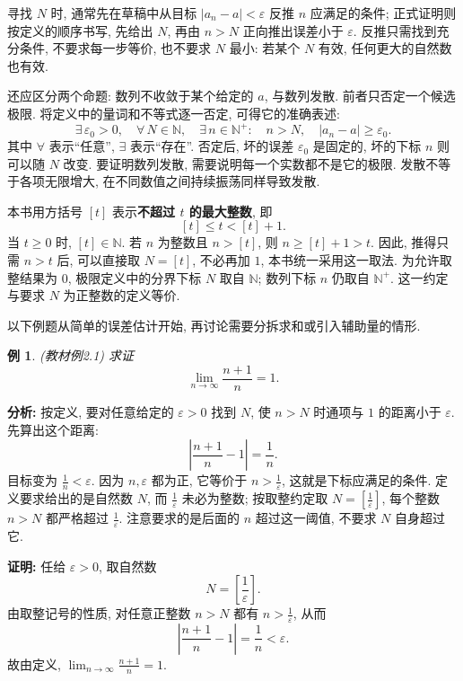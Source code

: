 \documentclass[UTF8,openany]{ctexbook}
\theoremstyle{chinesetextbook}
\newtheorem{example}{例}[section]
\newenvironment{cnproof}{\par\indent\textbf{证明:} \ignorespaces}{\par}
\begin{document}
寻找 $N$ 时, 通常先在草稿中从目标 $|a_n-a|<\varepsilon$ 反推 $n$ 应满足的条件; 正式证明则按定义的顺序书写, 先给出 $N$, 再由 $n>N$ 正向推出误差小于 $\varepsilon$. 反推只需找到充分条件, 不要求每一步等价, 也不要求 $N$ 最小: 若某个 $N$ 有效, 任何更大的自然数也有效.

还应区分两个命题: 数列不收敛于某个给定的 $a$, 与数列发散. 前者只否定一个候选极限. 将定义中的量词和不等式逐一否定, 可得它的准确表述:
\[
\exists\,\varepsilon_0>0,\quad
\forall\,N\in\mathbb N,\quad
\exists\,n\in\mathbb N^+:\quad
n>N,\quad |a_n-a|\ge\varepsilon_0.
\]
其中 $\forall$ 表示“任意”, $\exists$ 表示“存在”. 否定后, 坏的误差 $\varepsilon_0$ 是固定的, 坏的下标 $n$ 则可以随 $N$ 改变. 要证明数列发散, 需要说明每一个实数都不是它的极限. 发散不等于各项无限增大, 在不同数值之间持续振荡同样导致发散.

本书用方括号 $[t]$ 表示\textbf{不超过 $t$ 的最大整数}, 即
\[
[t]\le t<[t]+1.
\]
当 $t\ge0$ 时, $[t]\in\mathbb N$. 若 $n$ 为整数且 $n>[t]$, 则 $n\ge[t]+1>t$. 因此, 推得只需 $n>t$ 后, 可以直接取 $N=[t]$, 不必再加 $1$, 本书统一采用这一取法. 为允许取整结果为 $0$, 极限定义中的分界下标 $N$ 取自 $\mathbb N$; 数列下标 $n$ 仍取自 $\mathbb N^+$. 这一约定与要求 $N$ 为正整数的定义等价.

以下例题从简单的误差估计开始, 再讨论需要分拆求和或引入辅助量的情形.

\begin{example}
\textnormal{(教材例2.1)} 求证
\[
\lim_{n\to\infty}\frac{n+1}{n}=1.
\]
\end{example}

\par\indent\textbf{分析:} 按定义, 要对任意给定的 $\varepsilon>0$ 找到 $N$, 使 $n>N$ 时通项与 $1$ 的距离小于 $\varepsilon$. 先算出这个距离:
\[
\left|\frac{n+1}{n}-1\right|=\frac1n.
\]
目标变为 $\displaystyle\frac1n<\varepsilon$. 因为 $n,\varepsilon$ 都为正, 它等价于 $\displaystyle n>\frac1\varepsilon$, 这就是下标应满足的条件. 定义要求给出的是自然数 $N$, 而 $\displaystyle\frac1\varepsilon$ 未必为整数; 按取整约定取 $\displaystyle N=\left[\frac1\varepsilon\right]$, 每个整数 $n>N$ 都严格超过 $\displaystyle\frac1\varepsilon$. 注意要求的是后面的 $n$ 超过这一阈值, 不要求 $N$ 自身超过它.

\begin{cnproof}
任给 $\varepsilon>0$, 取自然数
\[
N=\left[\frac1\varepsilon\right].
\]
由取整记号的性质, 对任意正整数 $n>N$ 都有 $\displaystyle n>\frac1\varepsilon$, 从而
\[
\left|\frac{n+1}{n}-1\right|=\frac1n<\varepsilon.
\]
故由定义, $\displaystyle\lim_{n\to\infty}\frac{n+1}{n}=1$.
\end{cnproof}
\end{document}

